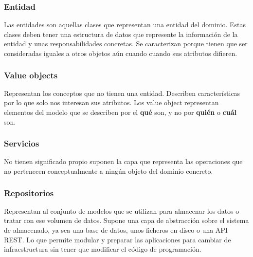 \subsubsection{Entidad}
Las entidades son aquellas clases que representan una entidad del dominio. Estas clases deben tener una estructura de datos que represente la información de la entidad y unas responsabilidades concretas. Se caracterizan porque tienen que ser consideradas iguales a otros objetos aún cuando cuando sus atributos difieren.

\subsubsection{Value objects}
Representan los conceptos que no tienen una entidad. Describen características por lo que solo nos interesan sus atributos.
Los value object representan elementos del modelo que se describen por el \textbf{qué} son, y no por \textbf{quién} o \textbf{cuál} son.

\subsubsection{Servicios}
No tienen significado propio suponen la capa que representa las operaciones que no pertenecen conceptualmente a ningún objeto del dominio concreto.

\subsubsection{Repositorios}
Representan al conjunto de modelos que se utilizan para almacenar los datos o tratar con ese volumen de datos. Supone una capa de abstracción sobre el sistema de almacenado, ya sea una base de datos, unos ficheros en disco o una API REST. Lo que permite modular y preparar las aplicaciones para cambiar de infraestructura sin tener que modificar el código de programación.

